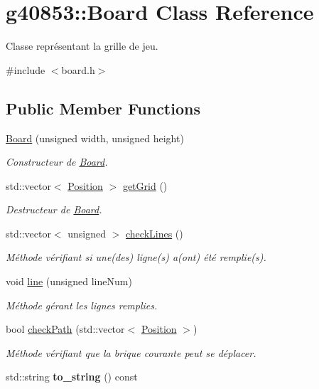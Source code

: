 \hypertarget{classg40853_1_1_board}{}\section{g40853\+:\+:Board Class Reference}
\label{classg40853_1_1_board}


Classe représentant la grille de jeu.  




{\ttfamily \#include $<$board.\+h$>$}

\subsection*{Public Member Functions}
\begin{DoxyCompactItemize}
\item 
\hyperlink{classg40853_1_1_board_a977453d70c09bc5c943507febdef3576}{Board} (unsigned width, unsigned height)
\begin{DoxyCompactList}\small\item\em Constructeur de \hyperlink{classg40853_1_1_board}{Board}. \end{DoxyCompactList}\item 
std\+::vector$<$ \hyperlink{classg40853_1_1_position}{Position} $>$ \hyperlink{classg40853_1_1_board_ae3d7d771be75130c65c592c1d13527a1}{get\+Grid} ()
\begin{DoxyCompactList}\small\item\em Destructeur de \hyperlink{classg40853_1_1_board}{Board}. \end{DoxyCompactList}\item 
std\+::vector$<$ unsigned $>$ \hyperlink{classg40853_1_1_board_ae488e255dcf0fc9596870c60bf09a680}{check\+Lines} ()
\begin{DoxyCompactList}\small\item\em Méthode vérifiant si une(des) ligne(s) a(ont) été remplie(s). \end{DoxyCompactList}\item 
void \hyperlink{classg40853_1_1_board_a620510bbdc174bd73f27c6fc1f37ada1}{line} (unsigned line\+Num)
\begin{DoxyCompactList}\small\item\em Méthode gérant les lignes remplies. \end{DoxyCompactList}\item 
bool \hyperlink{classg40853_1_1_board_a35e8081321fe2e5e50492efd4d6806db}{check\+Path} (std\+::vector$<$ \hyperlink{classg40853_1_1_position}{Position} $>$)
\begin{DoxyCompactList}\small\item\em Méthode vérifiant que la brique courante peut se déplacer. \end{DoxyCompactList}\item 
\hypertarget{classg40853_1_1_board_af365bc1c2e1d3fa86d04ba3aed711d08}{}\label{classg40853_1_1_board_af365bc1c2e1d3fa86d04ba3aed711d08} 
std\+::string {\bfseries to\+\_\+string} () const
\end{DoxyCompactItemize}
